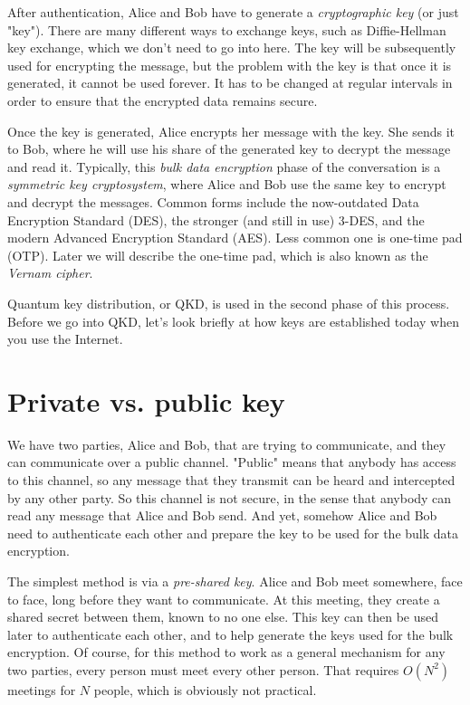 After authentication, Alice and Bob have to generate a \emph{cryptographic key} (or just "key"). There are many different ways to exchange keys, such as Diffie-Hellman key exchange, which we don't need to go into here. The key will be subsequently used for encrypting the message, but the problem with the key is that once it is generated, it cannot be used forever. It has to be changed at regular intervals in order to ensure that the encrypted data remains secure.

Once the key is generated, Alice encrypts her message with the key. She sends it to Bob, where he will use his share of the generated key to decrypt the message and read it.  Typically, this \emph{bulk data encryption} phase of the conversation is a \emph{symmetric key cryptosystem}, where Alice and Bob use the same key to encrypt and decrypt the messages. Common forms include the now-outdated Data Encryption Standard (DES), the stronger (and still in use) 3-DES, and the modern Advanced Encryption Standard (AES). Less common one is one-time pad (OTP). Later we will describe the one-time pad, which is also known as the \emph{Vernam cipher}.

Quantum key distribution, or QKD, is used in the second phase of this process.  Before we go into QKD, let's look briefly at how keys are established today when you use the Internet.

\section{Private vs. public key}

We have two parties, Alice and Bob, that are trying to communicate, and they can communicate over a public channel. "Public" means that anybody has access to this channel, so any message that they transmit can be heard and intercepted by any other party. So this channel is not secure, in the sense that anybody can read any message that Alice and Bob send. And yet, somehow Alice and Bob need to authenticate each other and prepare the key to be used for the bulk data encryption.

The simplest method is via a \emph{pre-shared key}. Alice and Bob meet somewhere, face to face, long before they want to communicate.  At this meeting, they create a shared secret between them, known to no one else.  This key can then be used later to authenticate each other, and to help generate the keys used for the bulk encryption.  Of course, for this method to work as a general mechanism for any two parties, every person must meet every other person.  That requires $O(N^2)$ meetings for $N$ people, which is obviously not practical.

